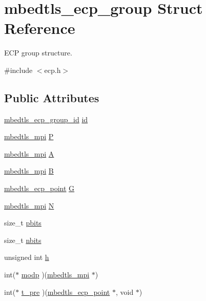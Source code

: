 \hypertarget{structmbedtls__ecp__group}{\section{mbedtls\-\_\-ecp\-\_\-group Struct Reference}
\label{structmbedtls__ecp__group}
}


E\-C\-P group structure.  




{\ttfamily \#include $<$ecp.\-h$>$}

\subsection*{Public Attributes}
\begin{DoxyCompactItemize}
\item 
\hyperlink{ecp_8h_af79e530ea8f8416480f805baa20b1a2d}{mbedtls\-\_\-ecp\-\_\-group\-\_\-id} \hyperlink{structmbedtls__ecp__group_a3e572cd2e40e1c23fc9a7a6aef7122d6}{id}
\item 
\hyperlink{structmbedtls__mpi}{mbedtls\-\_\-mpi} \hyperlink{structmbedtls__ecp__group_ae049e9c949bf5d30e71b4b31819f6007}{P}
\item 
\hyperlink{structmbedtls__mpi}{mbedtls\-\_\-mpi} \hyperlink{structmbedtls__ecp__group_af6ab87eb277c78f786ca58ed3fd78825}{A}
\item 
\hyperlink{structmbedtls__mpi}{mbedtls\-\_\-mpi} \hyperlink{structmbedtls__ecp__group_ab54c9e6b1807d5c10db76f7ebedd55f4}{B}
\item 
\hyperlink{structmbedtls__ecp__point}{mbedtls\-\_\-ecp\-\_\-point} \hyperlink{structmbedtls__ecp__group_a7e0aca0789ca8f5c38d3a0c98b2f9809}{G}
\item 
\hyperlink{structmbedtls__mpi}{mbedtls\-\_\-mpi} \hyperlink{structmbedtls__ecp__group_a7104724a939b7eef2ae3627db410e1e8}{N}
\item 
size\-\_\-t \hyperlink{structmbedtls__ecp__group_a039ad9e51dc52e46a422e74051b2b837}{pbits}
\item 
size\-\_\-t \hyperlink{structmbedtls__ecp__group_aee5ef1a30d9a5e34810c7a9a7120a10b}{nbits}
\item 
unsigned int \hyperlink{structmbedtls__ecp__group_a3cc458ace9f663e7827a6c3556e75e64}{h}
\item 
int($\ast$ \hyperlink{structmbedtls__ecp__group_a3417a910c8ca2a3d5986f2a3cd4068d5}{modp} )(\hyperlink{structmbedtls__mpi}{mbedtls\-\_\-mpi} $\ast$)
\item 
int($\ast$ \hyperlink{structmbedtls__ecp__group_a14933889cd68b78fdb8b92956623b6dc}{t\-\_\-pre} )(\hyperlink{structmbedtls__ecp__point}{mbedtls\-\_\-ecp\-\_\-point} $\ast$, void $\ast$)

\end{DoxyCompactItemize}

